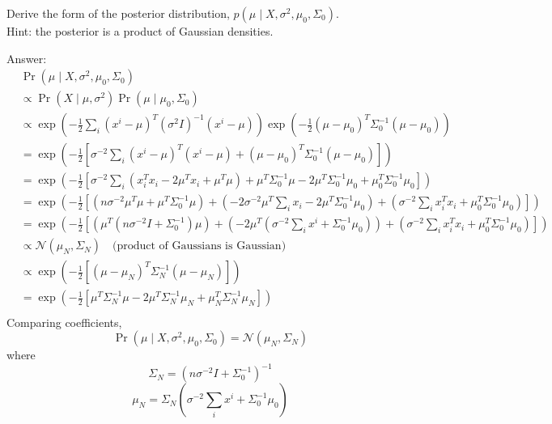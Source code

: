 \documentclass{article}
\def\ans#1{\par\gre{Answer: #1}}
\def\blu#1{{\color{blu}#1}}
\def\gre#1{{\color{gre}#1}}
\def\cond{\; | \;}
\begin{document}
 \blu{Derive the form of the posterior distribution, $p(\mu\cond X, \sigma^2, \mu_0, \Sigma_0)$.}\\
Hint: the posterior is a product of Gaussian densities.
\ans{
\begin{equation}
\begin{aligned}
   &\Pr(\mu\cond X,\sigma^2, \mu_0, \Sigma_0)\\
   &\propto \Pr(X\cond \mu,\sigma^2)\Pr(\mu\cond \mu_0,\Sigma_0)\\
   &\propto \exp\left(-\frac{1}{2}\sum_i (x^i-\mu)^T(\sigma^2 I)^{-1}(x^i-\mu)\right)
   \exp\left(-\frac{1}{2}(\mu-\mu_0)^T \Sigma_0^{-1}(\mu-\mu_0)\right)\\
   &=\exp\left(-\frac{1}{2}
   \left[\sigma^{-2}\sum_i (x^i-\mu)^T (x^i-\mu)
   + (\mu-\mu_0)^T \Sigma_0^{-1}(\mu-\mu_0)\right]
   \right)\\
   &= \exp\left(-\frac{1}{2}
   \left[\sigma^{-2}\sum_i 
   \left(x_i^T x_i - 2\mu^T x_i + \mu^T \mu\right)
   + \mu^T \Sigma_0^{-1}\mu - 2\mu^T \Sigma_0^{-1} \mu_0
   + \mu_0^T \Sigma_0^{-1}\mu_0
   \right]
   \right)\\
   &= \exp\left(-\frac{1}{2}\left[
   \left(n\sigma^{-2}\mu^T \mu + \mu^T \Sigma_0^{-1}\mu\right)
   + \left(-2\sigma^{-2}\mu^T \sum_i x_i 
   - 2\mu^T \Sigma_0^{-1}\mu_0 \right)
   + \left(\sigma^{-2}\sum_i x_i^T x_i 
   + \mu_0^T \Sigma_0^{-1}\mu_0\right)
   \right]\right)\\
   &= \exp\left(-\frac{1}{2}\left[
   \left(\mu^T (n\sigma^{-2}I + \Sigma_0^{-1})\mu\right)
   + \left(-2\mu^T (\sigma^{-2}\sum_i x^i + \Sigma_0^{-1}\mu_0)\right)
   + \left(\sigma^{-2}\sum_i x_i^T x_i 
   + \mu_0^T \Sigma_0^{-1}\mu_0\right)
   \right]\right)\\
   &\propto \mathcal{N}(\mu_N,\Sigma_N) 
   \quad\text{(product of Gaussians is Gaussian)}\\
   &\propto \exp\left(-\frac{1}{2}\left[
   (\mu-\mu_N)^T \Sigma_N^{-1} (\mu-\mu_N)
   \right]\right) \\
   &= \exp\left(-\frac{1}{2}\left[
   \mu^T \Sigma_N^{-1} \mu - 2\mu^T \Sigma_N^{-1} \mu_N 
   + \mu_N^T \Sigma_N^{-1} \mu_N
   \right]\right)\\
\end{aligned}
\end{equation}
Comparing coefficients,
\[\Pr(\mu\cond X,\sigma^2, \mu_0, \Sigma_0)=\mathcal{N}(\mu_N,\Sigma_N)\]
where
\[\Sigma_N=(n\sigma^{-2}I + \Sigma_0^{-1})^{-1}\]
\[\mu_N=\Sigma_N\left(\sigma^{-2}\sum_i x^i + \Sigma_0^{-1}\mu_0\right)\]
}
\end{document}
